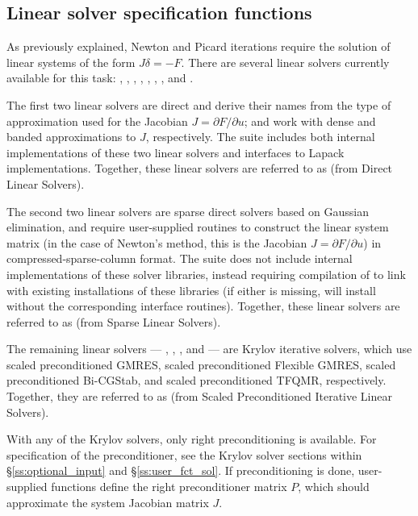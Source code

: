 
\subsection{Linear solver specification functions}\label{sss:lin_solv_init}

As previously explained, Newton and Picard iterations require the solution of
linear systems of the form $J\delta = -F$. There are several {\kinsol} linear
solvers currently available for this task: {\kindense}, {\kinband},
{\kinklu}, {\kinsuperlumt}, {\kinspgmr}, {\kinspfgmr}, {\kinspbcg}, and {\kinsptfqmr}.

The first two linear solvers are direct and derive their names from the
type of approximation used for the Jacobian $J = \partial{F}/\partial{u}$;
{\kindense} and {\kinband} work with dense and banded approximations
to $J$, respectively.  The {\sundials} suite includes both internal
implementations of these two linear solvers and interfaces to Lapack
implementations.  Together, these linear solvers are referred to as
{\kindls} (from Direct Linear Solvers).

The second two linear solvers are sparse direct solvers based on
Gaussian elimination, and require user-supplied routines to construct
the linear system matrix (in the case of Newton's method, this is the 
Jacobian $J = \partial{F}/\partial{u}$) in compressed-sparse-column
format. The {\sundials} suite does not include internal
implementations of these solver libraries, instead requiring
compilation of {\sundials} to link with existing installations of
these libraries (if either is missing, {\sundials} will install
without the corresponding interface routines).  Together, these linear
solvers are referred to as {\kinsls} (from Sparse Linear Solvers). 

The remaining {\kinsol} linear solvers --- {\kinspgmr}, {\kinspfgmr}, {\kinspbcg},
and {\kinsptfqmr} --- are Krylov iterative solvers, which use scaled
preconditioned GMRES, scaled preconditioned Flexible GMRES,
scaled preconditioned Bi-CGStab, and scaled
preconditioned TFQMR, respectively.  Together, they are referred to as
{\kinspils} (from Scaled Preconditioned Iterative Linear Solvers).

With any of the Krylov solvers, only right preconditioning is available.
For specification of the preconditioner, see the Krylov solver sections
within \S\ref{ss:optional_input} and \S\ref{ss:user_fct_sol}.
If preconditioning is done, user-supplied functions define the right
preconditioner matrix $P$, which should approximate the system
Jacobian matrix $J$.


